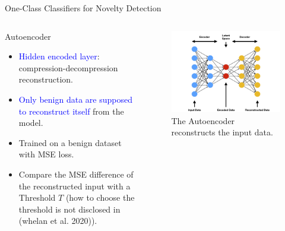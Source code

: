 \documentclass[aspectratio=169, 8pt]{beamer}
\begin{document}
\begin{frame}{One-Class Classifiers for Novelty Detection}


\begin{columns}[T]

    \begin{column}{0.5\linewidth}
    
        \begin{block}{Autoencoder}
            \begin{itemize}
                \item \textcolor{blue}{Hidden encoded layer}: compression-decompression reconstruction.
                \item \textcolor{blue}{Only benign data are supposed to reconstruct itself} from the model.
                \item Trained on a benign dataset with MSE loss.
                
                \item Compare the MSE difference of the reconstructed input with a Threshold \(T\)
                (how to choose the threshold is not disclosed in (whelan et al. 2020)).
            \end{itemize}
                    
        \end{block}
        
    \end{column}
    
    \begin{column}{0.5\linewidth}
        \begin{figure}
            \centering
            \includegraphics[width = \textwidth]{images/ae.png}
            \caption{The Autoencoder reconstructs the input data.}
            \label{fig:enter-label}
        \end{figure}
    \end{column}
\end{columns}

\end{frame}
\end{document}
